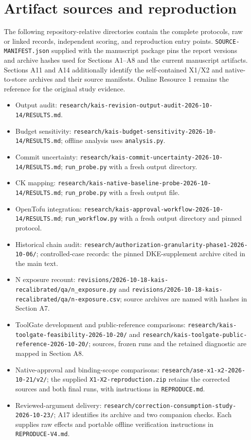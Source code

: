 \documentclass[10pt,a4paper]{article}
\begin{document}
\section*{Artifact sources and reproduction}
The following repository-relative directories contain the complete protocols, raw or linked records, independent scoring, and reproduction entry points. \texttt{SOURCE-MANIFEST.json} supplied with the manuscript package pins the report versions and archive hashes used for Sections A1--A8 and the current manuscript artifacts. Sections A11 and A14 additionally identify the self-contained X1/X2 and native-to-store archives and their source manifests. Online Resource 1 remains the reference for the original study evidence.
\begin{itemize}
\item Output audit: \nolinkurl{research/kais-revision-output-audit-2026-10-14/RESULTS.md}.
\item Budget sensitivity: \nolinkurl{research/kais-budget-sensitivity-2026-10-14/RESULTS.md}; offline analysis uses \texttt{analysis.py}.
\item Commit uncertainty: \nolinkurl{research/kais-commit-uncertainty-2026-10-14/RESULTS.md}; \texttt{run\_probe.py} with a fresh output directory.
\item CK mapping: \nolinkurl{research/kais-native-baseline-probe-2026-10-14/RESULTS.md}; \texttt{run\_probe.py} with a fresh output file.
\item OpenTofu integration: \nolinkurl{research/kais-approval-workflow-2026-10-14/RESULTS.md}; \texttt{run\_workflow.py} with a fresh output directory and pinned protocol.
\item Historical chain audit: \nolinkurl{research/authorization-granularity-phase1-2026-10-06/}; controlled-case records: the pinned DKE-supplement archive cited in the main text.
\item N exposure recount: \nolinkurl{revisions/2026-10-18-kais-recalibrated/qa/n_exposure.py} and \nolinkurl{revisions/2026-10-18-kais-recalibrated/qa/n-exposure.csv}; source archives are named with hashes in Section A7.
\item ToolGate development and public-reference comparisons: \nolinkurl{research/kais-toolgate-feasibility-2026-10-20/} and \nolinkurl{research/kais-toolgate-public-reference-2026-10-20/}; sources, frozen runs and the retained diagnostic are mapped in Section A8.
\item Native-approval and binding-scope comparisons: \nolinkurl{research/ase-x1-x2-2026-10-21/v2/}; the supplied \texttt{X1-X2-reproduction.zip} retains the corrected sources and both final runs, with instructions in \texttt{REPRODUCE.md}.
\item Reviewed-argument delivery: \nolinkurl{research/correction-consumption-study-2026-10-23/}; A17 identifies its archive and two companion checks. Each supplies raw effects and portable offline verification instructions in \texttt{REPRODUCE-V4.md}.
\end{itemize}
\end{document}
